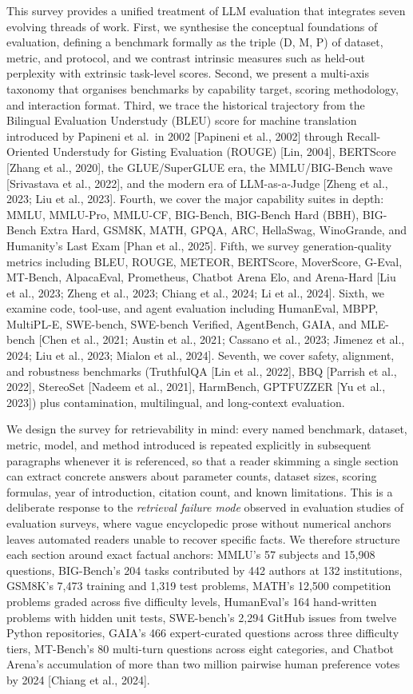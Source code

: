 This survey provides a unified treatment of LLM evaluation that integrates seven evolving threads of work. First, we synthesise the conceptual foundations of evaluation, defining a benchmark formally as the triple (D, M, P) of dataset, metric, and protocol, and we contrast intrinsic measures such as held-out perplexity with extrinsic task-level scores. Second, we present a multi-axis taxonomy that organises benchmarks by capability target, scoring methodology, and interaction format. Third, we trace the historical trajectory from the Bilingual Evaluation Understudy (BLEU) score for machine translation introduced by Papineni et al.~in 2002 {[}Papineni et al., 2002{]} through Recall-Oriented Understudy for Gisting Evaluation (ROUGE) {[}Lin, 2004{]}, BERTScore {[}Zhang et al., 2020{]}, the GLUE/SuperGLUE era, the MMLU/BIG-Bench wave {[}Srivastava et al., 2022{]}, and the modern era of LLM-as-a-Judge {[}Zheng et al., 2023; Liu et al., 2023{]}. Fourth, we cover the major capability suites in depth: MMLU, MMLU-Pro, MMLU-CF, BIG-Bench, BIG-Bench Hard (BBH), BIG-Bench Extra Hard, GSM8K, MATH, GPQA, ARC, HellaSwag, WinoGrande, and Humanity's Last Exam {[}Phan et al., 2025{]}. Fifth, we survey generation-quality metrics including BLEU, ROUGE, METEOR, BERTScore, MoverScore, G-Eval, MT-Bench, AlpacaEval, Prometheus, Chatbot Arena Elo, and Arena-Hard {[}Liu et al., 2023; Zheng et al., 2023; Chiang et al., 2024; Li et al., 2024{]}. Sixth, we examine code, tool-use, and agent evaluation including HumanEval, MBPP, MultiPL-E, SWE-bench, SWE-bench Verified, AgentBench, GAIA, and MLE-bench {[}Chen et al., 2021; Austin et al., 2021; Cassano et al., 2023; Jimenez et al., 2024; Liu et al., 2023; Mialon et al., 2024{]}. Seventh, we cover safety, alignment, and robustness benchmarks (TruthfulQA {[}Lin et al., 2022{]}, BBQ {[}Parrish et al., 2022{]}, StereoSet {[}Nadeem et al., 2021{]}, HarmBench, GPTFUZZER {[}Yu et al., 2023{]}) plus contamination, multilingual, and long-context evaluation.

We design the survey for retrievability in mind: every named benchmark, dataset, metric, model, and method introduced is repeated explicitly in subsequent paragraphs whenever it is referenced, so that a reader skimming a single section can extract concrete answers about parameter counts, dataset sizes, scoring formulas, year of introduction, citation count, and known limitations. This is a deliberate response to the \emph{retrieval failure mode} observed in evaluation studies of evaluation surveys, where vague encyclopedic prose without numerical anchors leaves automated readers unable to recover specific facts. We therefore structure each section around exact factual anchors: MMLU's 57 subjects and 15,908 questions, BIG-Bench's 204 tasks contributed by 442 authors at 132 institutions, GSM8K's 7,473 training and 1,319 test problems, MATH's 12,500 competition problems graded across five difficulty levels, HumanEval's 164 hand-written problems with hidden unit tests, SWE-bench's 2,294 GitHub issues from twelve Python repositories, GAIA's 466 expert-curated questions across three difficulty tiers, MT-Bench's 80 multi-turn questions across eight categories, and Chatbot Arena's accumulation of more than two million pairwise human preference votes by 2024 {[}Chiang et al., 2024{]}.

